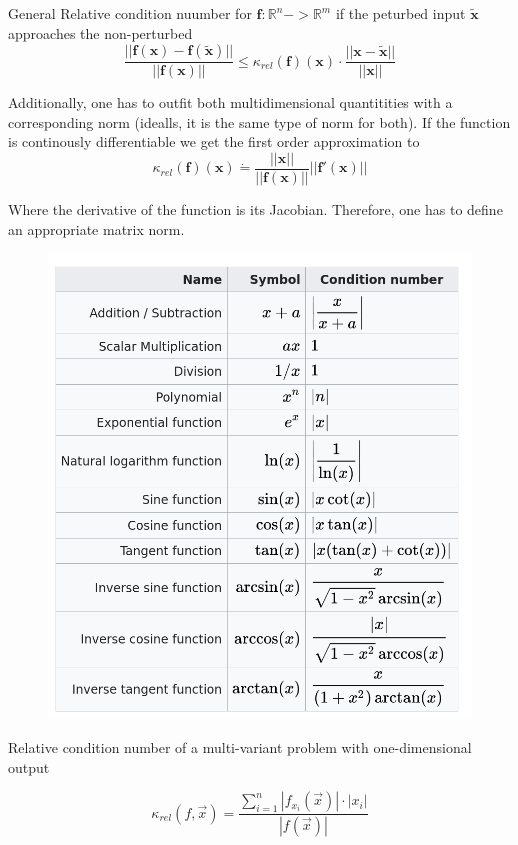 \documentclass[
    a4paper,
    11pt
]{article}
\begin{document}
\tableofcontents

General Relative condition nuumber for $\mathbf{f}:\mathbb{R}^n -> \mathbb{R}^m$ if the
peturbed input $\mathbf{\tilde{x}}$ approaches the non-perturbed
\begin{equation}
    \frac{||\mathbf{f}(\mathbf{x}) -
    \mathbf{f}(\mathbf{\tilde{x}})||}{||\mathbf{f}(\mathbf{x})||} \le
    \kappa_{rel}(\mathbf{f})(\mathbf{x}) \cdot
    \frac{||\mathbf{x} - \mathbf{\tilde{x}}||}{||\mathbf{x}||}
\end{equation}

Additionally, one has to outfit both multidimensional quantitities with a
corresponding norm (idealls, it is the same type of norm for both). If the
function is continously differentiable we get the first order approximation to
\begin{equation}
    \kappa_{rel}(\mathbf{f})(\mathbf{x}) \dot{=}
    \frac{||\mathbf{x}||}{||\mathbf{f}(\mathbf{x})||}
    ||\mathbf{f}'(\mathbf{x})||
\end{equation}

Where the derivative of the function is its Jacobian. Therefore, one has to
define an appropriate matrix norm.

\begin{figure}[H]
    \centering
    \includegraphics[width=0.5\linewidth]{basicOperations.png}
\end{figure}

Relative condition number of a multi-variant problem with one-dimensional output

\begin{equation}
    \kappa_{rel}(f, \vec{x}) =
    \frac{
        \sum_{i=1}^{n} \left| f_{x_i}(\vec{x}) \right| \cdot |x_i|
    } {
        \left| f(\vec{x}) \right|
    }
\end{equation}
\end{document}
